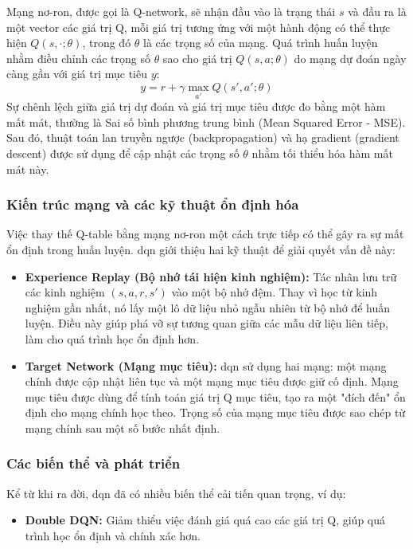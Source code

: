 \begin{enumerate}
Mạng nơ-ron, được gọi là Q-network, sẽ nhận đầu vào là trạng thái $s$ và đầu ra là
một vector các giá trị Q, mỗi giá trị tương ứng với một hành động có thể thực
hiện $Q(s, \cdot; \theta)$, trong đó $\theta$ là các trọng số của mạng. Quá
trình huấn luyện nhằm điều chỉnh các trọng số $\theta$ sao cho giá trị
$Q(s, a; \theta)$ do mạng dự đoán ngày càng gần với giá trị mục tiêu $y$:
\begin{equation}
    y = r + \gamma \max_{a'}Q(s', a'; \theta)
\end{equation}
Sự chênh lệch giữa giá trị dự đoán và giá trị mục tiêu được đo bằng một hàm mất mát,
thường là Sai số bình phương trung bình (Mean Squared Error - MSE). Sau đó,
thuật toán lan truyền ngược (backpropagation) và hạ gradient (gradient descent)
được sử dụng để cập nhật các trọng số $\theta$ nhằm tối thiểu hóa hàm mất mát
này.

\subsubsection{Kiến trúc mạng và các kỹ thuật ổn định hóa}
Việc thay thế Q-table bằng mạng nơ-ron một cách trực tiếp có thể gây ra sự mất
ổn định trong huấn luyện. \ac{dqn} giới thiệu hai kỹ thuật để giải quyết
vấn đề này:
\begin{itemize}
    \item \textbf{Experience Replay (Bộ nhớ tái hiện kinh nghiệm):} Tác nhân lưu
        trữ các kinh nghiệm $(s, a, r, s')$ vào một bộ nhớ đệm. Thay vì học từ kinh
        nghiệm gần nhất, nó lấy một lô dữ liệu nhỏ ngẫu nhiên từ bộ nhớ để huấn
        luyện. Điều này giúp phá vỡ sự tương quan giữa các mẫu dữ liệu liên tiếp,
        làm cho quá trình học ổn định hơn.

    \item \textbf{Target Network (Mạng mục tiêu):} \ac{dqn} sử dụng hai mạng:
        một mạng chính được cập nhật liên tục và một mạng mục tiêu được giữ cố
        định. Mạng mục tiêu được dùng để tính toán giá trị Q mục tiêu, tạo ra
        một "đích đến" ổn định cho mạng chính học theo. Trọng số của mạng mục tiêu
        được sao chép từ mạng chính sau một số bước nhất định.
\end{itemize}

\subsubsection{Các biến thể và phát triển}
Kể từ khi ra đời, \ac{dqn} đã có nhiều biến thể cải tiến quan trọng, ví dụ:
\begin{itemize}
    \item \textbf{Double DQN:} Giảm thiểu việc đánh giá quá cao các giá trị Q, giúp
        quá trình học ổn định và chính xác hơn.


\end{itemize}
\end{enumerate}

